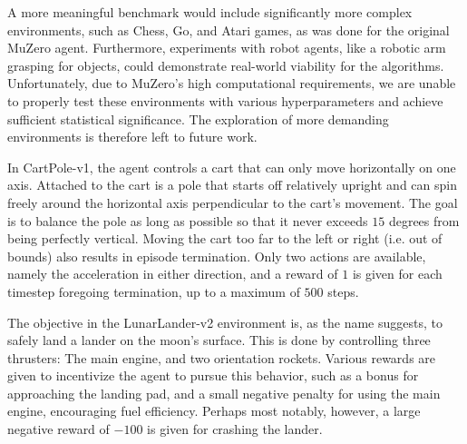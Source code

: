 A more meaningful benchmark would include significantly more complex environments, such as Chess, Go, and Atari games, as was done for the original MuZero agent. Furthermore, experiments with robot agents, like a robotic arm grasping for objects, could demonstrate real-world viability for the algorithms. Unfortunately, due to MuZero's high computational requirements, we are unable to properly test these environments with various hyperparameters and achieve sufficient statistical significance. The exploration of more demanding environments is therefore left to future work.

In CartPole-v1, the agent controls a cart that can only move horizontally on one axis. Attached to the cart is a pole that starts off relatively upright and can spin freely around the horizontal axis perpendicular to the cart's movement. The goal is to balance the pole as long as possible so that it never exceeds $15$ degrees from being perfectly vertical. Moving the cart too far to the left or right (i.e. out of bounds) also results in episode termination. Only two actions are available, namely the acceleration in either direction, and a reward of $1$ is given for each timestep foregoing termination, up to a maximum of $500$ steps.

The objective in the LunarLander-v2 environment is, as the name suggests, to safely land a lander on the moon's surface. This is done by controlling three thrusters: The main engine, and two orientation rockets. Various rewards are given to incentivize the agent to pursue this behavior, such as a bonus for approaching the landing pad, and a small negative penalty for using the main engine, encouraging fuel efficiency. Perhaps most notably, however, a large negative reward of $-100$ is given for crashing the lander.